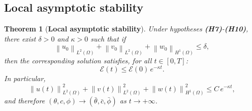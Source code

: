 \documentclass[final,1p,times]{elsarticle}
\numberwithin{equation}{section}
\newtheorem{theorem}{Theorem}[section]
\newcommand{\norm}[1]{\left\|#1\right\|}
\begin{document}
	\subsection{Local asymptotic stability}
	
	\begin{theorem}[\textbf{Local asymptotic stability}]
		\label{thm:stability}
		Under hypotheses \textup{\textbf{(H7)}}-\textup{\textbf{(H10)}}, there exist $\delta > 0$ and $\kappa > 0$ such
		that if
		\[
		\norm{u_0}_{L^2(\Omega)} + \norm{v_0}_{L^2(\Omega)} + \norm{w_0}_{H^1(\Omega)} \leq \delta,
		\]
		then the corresponding solution satisfies, for all $t \in [0, T]$:
		\[
		\mathcal{E}(t) \leq \mathcal{E}(0)\,e^{-\kappa t}.
		\]
		In particular,
		\[
		\norm{u(t)}_{L^2(\Omega)}^2 + \norm{v(t)}_{L^2(\Omega)}^2 + \norm{w(t)}_{H^1(\Omega)}^2
		\leq C\,e^{-\kappa t},
		\]
		and therefore $(\theta, c, \phi) \to (\bar\theta, \bar c, \bar\phi)$ as $t \to +\infty$.
	\end{theorem}
	
\end{document}
